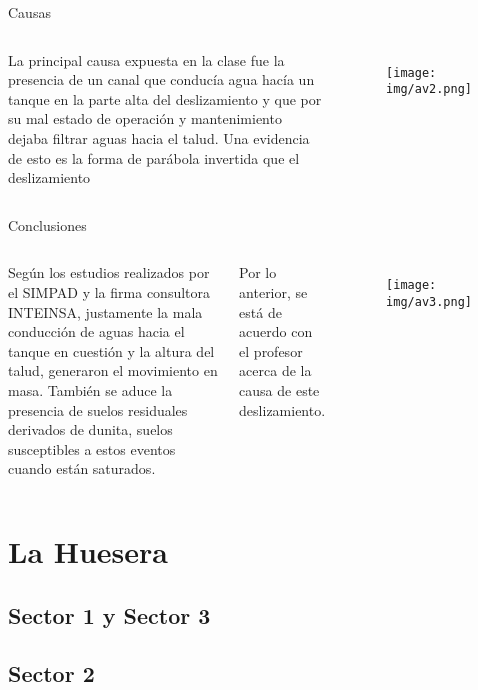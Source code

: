 \documentclass[11pt]{beamer}
\begin{document}
\begin{frame}{Causas}
\begin{columns}[t]

	\justify
	La principal causa expuesta en la clase fue la presencia de un canal que conducía agua hacía un tanque en la parte alta del deslizamiento y que por su mal estado de operación y mantenimiento dejaba filtrar aguas hacia el talud. Una evidencia de esto es la forma de parábola invertida que el deslizamiento 


\begin{figure}
	\texttt{[image: img/av2.png]}
\end{figure}
\end{columns}	

\end{frame}

\begin{frame}{Conclusiones}
\begin{columns}[t]
	
	
	\justify
	Según los estudios realizados por el SIMPAD y la firma consultora INTEINSA, justamente la mala conducción de aguas hacia el tanque en cuestión y la altura del talud, generaron el movimiento en masa. También se aduce la presencia de suelos residuales derivados de dunita, suelos susceptibles a estos eventos cuando están saturados.
	
	Por lo anterior, se está de acuerdo con el profesor acerca de la causa de este deslizamiento. 
	
	
	\begin{figure}
		\texttt{[image: img/av3.png]}
	\end{figure}
\end{columns}	

\end{frame}

\section{La Huesera} 
\subsection{Sector 1 y Sector 3}
\subsection{Sector 2}
\end{document}
